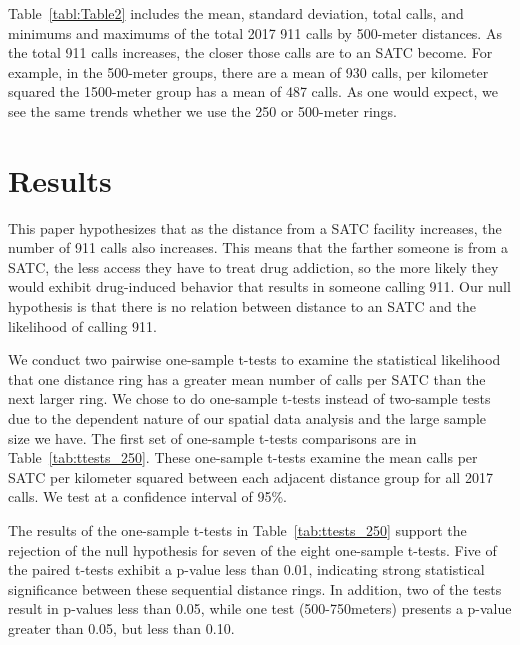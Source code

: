 \documentclass[12pt]{article}
\begin{document}
Table~\ref{tabl:Table2} includes the mean, standard deviation, total calls, and minimums and maximums of the total 2017 911 calls by 500-meter distances. As the total 911 calls increases, the closer those calls are to an SATC become. For example, in the 500-meter groups, there are a mean of 930 calls, per kilometer squared the 1500-meter group has a mean of 487 calls. As one would expect, we see the same trends whether we use the 250 or 500-meter rings.



\section{Results}
\label{sec:result}

This paper hypothesizes that as the distance from a SATC facility increases, the number of 911 calls also increases. This means that the farther someone is from a SATC, the less access they have to treat drug addiction, so the more likely they would exhibit drug-induced behavior that results in someone calling 911. Our null hypothesis is that there is no relation between distance to an SATC and the likelihood of calling 911.
 
We conduct two pairwise one-sample t-tests to examine the statistical likelihood that one distance ring has a greater mean number of calls per SATC than the next larger ring. We chose to do one-sample t-tests instead of two-sample tests due to the dependent nature of our spatial data analysis and the large sample size we have. The first set of one-sample t-tests comparisons are in Table~\ref{tab:ttests_250}. These one-sample t-tests examine the mean calls per SATC per kilometer squared between each adjacent distance group for all 2017 calls. We test at a confidence interval of 95\%.

The results of the one-sample t-tests in Table~\ref{tab:ttests_250} support the rejection of the null hypothesis for seven of the eight one-sample t-tests. Five of the paired t-tests exhibit a p-value less than 0.01, indicating strong statistical significance between these sequential distance rings. In addition, two of the tests result in p-values less than 0.05, while one test (500-750meters) presents a p-value greater than 0.05, but less than 0.10. 

\label{tabl:Table4}
\end{document}
